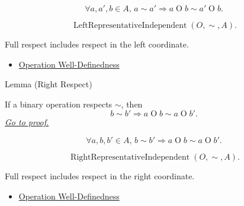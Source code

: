 \begin{remark*}
\[
\forall a,a',b\in A,\,
a\sim a' \Rightarrow a\mathbin{O}b\sim a'\mathbin{O}b.
\]
\end{remark*}

\begin{remark*}
\[
\operatorname{LeftRepresentativeIndependent}(O,\sim,A).
\]
\end{remark*}

\begin{remark*}[Interpretation]
Full respect includes respect in the left coordinate.
\end{remark*}

\begin{dependencies}
\begin{itemize}
  \item \hyperref[def:operation-well-definedness]{Operation Well-Definedness}
\end{itemize}
\end{dependencies}

\begin{lemmabox}{Lemma (Right Respect)}
\begin{lemma}
\label{lem:operation-right-respect}
If a binary operation respects $\sim$, then
\[
b\sim b' \Longrightarrow a\mathbin{O}b\sim a\mathbin{O}b'.
\]
\hyperref[prf:operation-right-respect]{\textit{Go to proof.}}
\end{lemma}
\end{lemmabox}

\begin{remark*}
\[
\forall a,b,b'\in A,\,
b\sim b' \Rightarrow a\mathbin{O}b\sim a\mathbin{O}b'.
\]
\end{remark*}

\begin{remark*}
\[
\operatorname{RightRepresentativeIndependent}(O,\sim,A).
\]
\end{remark*}

\begin{remark*}[Interpretation]
Full respect includes respect in the right coordinate.
\end{remark*}

\begin{dependencies}
\begin{itemize}
  \item \hyperref[def:operation-well-definedness]{Operation Well-Definedness}
\end{itemize}
\end{dependencies}

